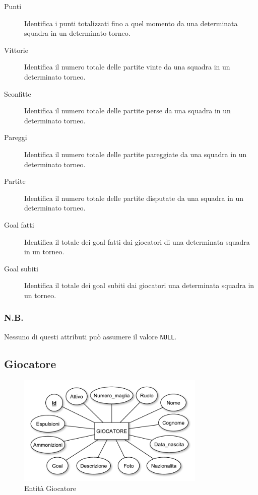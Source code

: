 		\begin{description}
			
			\item[Punti]
			Identifica i punti totalizzati fino a quel momento da una determinata squadra in un determinato torneo.
			
			\item[Vittorie]
			Identifica il numero totale delle partite vinte da una squadra in un determinato torneo.
			
			\item[Sconfitte]
			Identifica il numero totale delle partite perse da una squadra in un determinato torneo.
			
			\item[Pareggi]
			Identifica il numero totale delle partite pareggiate da una squadra in un determinato torneo.
			
			\item[Partite]
			Identifica il numero totale delle partite disputate da una squadra in un determinato torneo.
			
			\item[Goal fatti]
			Identifica il totale dei goal fatti dai giocatori di una determinata squadra in un torneo.
			
			\item[Goal subiti]
			Identifica il totale dei goal subiti dai giocatori una determinata squadra in un torneo.
			
		\end{description}
		
		\subsubsection*{N.B.}
		Nessuno di questi attributi può assumere il valore \texttt{NULL}.
		
	\subsection{Giocatore}
	
		\begin{figure}[h]
			\centering
			\includegraphics[width=0.8\textwidth]
			{immagini/11-giocatore}
			
			\caption{Entità Giocatore}
			\label{entita-giocatore}
		\end{figure}
		
